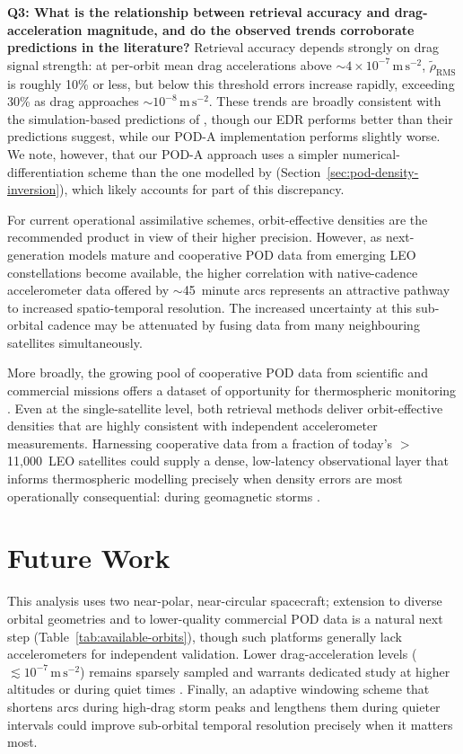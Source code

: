 \documentclass[draft]{agujournal2019}
\begin{document}
\textbf{Q3: What is the relationship between retrieval accuracy and drag-acceleration magnitude, and do the observed trends corroborate predictions in the literature?}
Retrieval accuracy depends strongly on drag signal strength: at per-orbit
mean drag accelerations above $\sim$$4 \times 10^{-7}\,\mathrm{m\,s^{-2}}$,
$\tilde{\rho}_{\text{RMS}}$ is roughly 10\% or less, but below this
threshold errors increase rapidly, exceeding 30\% as drag approaches
$\sim$$10^{-8}\,\mathrm{m\,s^{-2}}$. These trends are broadly consistent
with the simulation-based predictions of ,
though our EDR performs better than their predictions suggest, while our
POD-A implementation performs slightly worse. We note, however, that our POD-A approach uses a simpler
numerical-differentiation scheme than the one modelled by
 (Section~\ref{sec:pod-density-inversion}),
which likely accounts for part of this discrepancy.

For current operational assimilative schemes, orbit-effective
densities are the recommended product in view of their higher precision.
However, as next-generation models mature and cooperative POD data from
emerging LEO constellations become available, the higher correlation with
native-cadence accelerometer data offered by $\sim$45~minute arcs
represents an attractive pathway to increased spatio-temporal resolution.
The increased uncertainty at this sub-orbital cadence may be attenuated
by fusing data from many neighbouring satellites simultaneously.

More broadly, the growing pool of cooperative POD data from scientific and
commercial missions offers a dataset of opportunity for thermospheric
monitoring \cite{Fitzpatrick2024ApplyingSatellite, Arnold2023PreciseSatellites}.
Even at the single-satellite level, both retrieval methods deliver
orbit-effective densities that are highly consistent with independent
accelerometer measurements. Harnessing cooperative data from a fraction of
today's $>$11,000~LEO satellites could supply a dense, low-latency
observational layer that informs thermospheric modelling precisely when
density errors are most operationally consequential: during geomagnetic
storms \cite{Parker2024SatelliteGannon, Parker2024InfluencesAssessment,
Berger2023TheOperations}.

\section{Future Work}
This analysis uses two near-polar, near-circular spacecraft; extension to diverse orbital geometries and to lower-quality commercial POD data \cite{Arnold2023PreciseSatellites, Fitzpatrick2024HarnessingAwareness} is a natural next step (Table~\ref{tab:available-orbits}), though such platforms generally lack accelerometers for independent validation. Lower drag-acceleration levels ($\lesssim 10^{-7}\,\mathrm{m\,s^{-2}}$) remains sparsely sampled and warrants dedicated study at higher altitudes or during quiet times \cite{Ray2024ErrorMinimum}. Finally, an adaptive windowing scheme that shortens arcs during high-drag storm peaks and lengthens them during quieter intervals could improve sub-orbital temporal resolution precisely when it matters most.
\end{document}

